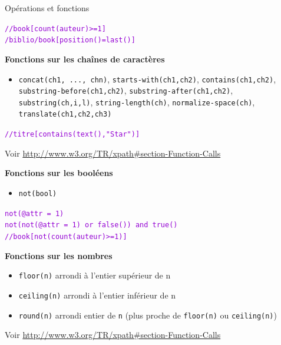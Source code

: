 \begin{frame}[allowframebreaks]{Op\'erations et fonctions}
\begin{flushright}
\textcolor{DarkViolet}{\verb?//book[count(auteur)>=1]?\\
\verb?/biblio/book[position()=last()]?}
\end{flushright}

\framebreak

{\bf Fonctions sur les cha\^{i}nes de caract\`eres}

\begin{itemize}
\item \verb?concat(ch1, ..., chn)?, \verb?starts-with(ch1,ch2)?, \verb?contains(ch1,ch2)?, \verb?substring-before(ch1,ch2)?, \verb?substring-after(ch1,ch2)?, \verb?substring(ch,i,l)?, \verb?string-length(ch)?, \verb?normalize-space(ch)?, \verb?translate(ch1,ch2,ch3)?
\end{itemize}

\begin{flushright}
\textcolor{DarkViolet}{\verb?//titre[contains(text(),"Star")]?}
\end{flushright}


Voir \url{http://www.w3.org/TR/xpath\#section-Function-Calls}


\framebreak

{\bf Fonctions sur les bool\'eens}

\begin{itemize}
\item \verb?not(bool)?
\end{itemize}

\begin{flushright}
\textcolor{DarkViolet}{\verb?not(@attr = 1)?\\
\verb?not(not(@attr = 1) or false()) and true()?\\
\verb?//book[not(count(auteur)>=1)]?
}
\end{flushright}


\framebreak

{\bf Fonctions sur les nombres}

\begin{itemize}
\item \verb?floor(n)? arrondi à l'entier sup\'erieur de n
\item \verb?ceiling(n)? arrondi à l'entier inf\'erieur de n
\item \verb?round(n)? arrondi entier de \verb?n? (plus proche de \verb?floor(n)? ou \verb?ceiling(n)?)
\end{itemize}

Voir \url{http://www.w3.org/TR/xpath\#section-Function-Calls}

\end{frame}


